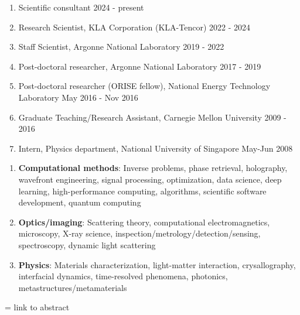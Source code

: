 \documentclass[11pt]{article}
\begin{document}
\begin{enumerate}
    \item Scientific consultant \hfill 2024 - present
    \item Research Scientist, KLA Corporation (KLA-Tencor) \hfill 2022 - 2024
    \item Staff Scientist, Argonne National Laboratory \hfill 2019 - 2022
    \item Post-doctoral researcher, Argonne National Laboratory \hfill 2017 - 2019
    \item Post-doctoral researcher (ORISE fellow), National Energy Technology Laboratory  \hfill May 2016 - Nov 2016
    \item Graduate Teaching/Research Assistant, Carnegie Mellon University \hfill 2009 - 2016
    \item Intern, Physics department, National University of Singapore \hfill May-Jun 2008 
\end{enumerate} 

\begin{enumerate}
    \item \textbf{Computational methods}: Inverse problems, phase retrieval, holography, wavefront engineering, signal processing, optimization, data science, deep learning, high-performance computing, algorithms, scientific software development, quantum computing
    \item \textbf{Optics/imaging}: Scattering theory, computational electromagnetics, microscopy, X-ray science, inspection/metrology/detection/sensing, spectroscopy, dynamic light scattering 
    \item \textbf{Physics}: Materials characterization, light-matter interaction, crysallography, interfacial dynamics, time-resolved phenomena, photonics, metastructures/metamaterials
\end{enumerate} 

 = link to abstract
\end{document}
